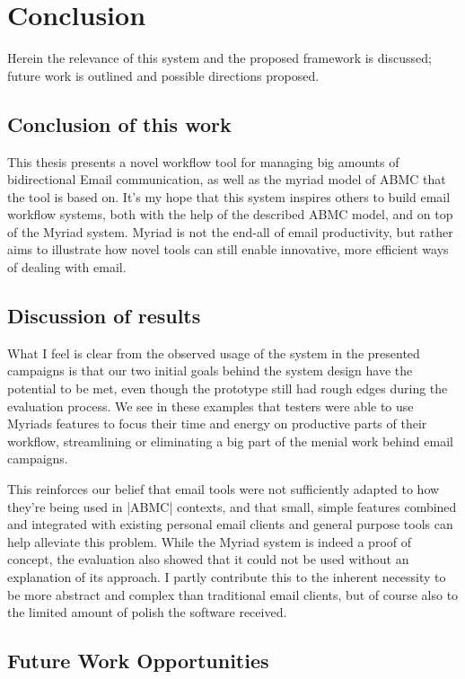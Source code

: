 \chapter{Conclusion}
\label{chapter:Conclusion}

Herein the relevance of this system and the proposed framework is discussed; future work is outlined and possible directions proposed.

\section{Conclusion of this work}

This thesis presents a novel workflow tool for managing big amounts of bidirectional Email communication, as well as the myriad model of ABMC that the tool is based on.
It’s my hope that this system inspires others to build email workflow systems, both with the help of the described ABMC model, and on top of the Myriad system. Myriad is not the end-all of email productivity, but rather aims to illustrate how novel tools can still enable innovative, more efficient ways of dealing with email.

\section{Discussion of results}

What I feel is clear from the observed usage of the system in the presented campaigns is that our two initial goals behind the system design have the potential to be met, even though the prototype still had rough edges during the evaluation process. We see in these examples that testers were able to use Myriads features to focus their time and energy on productive parts of their workflow, streamlining or eliminating a big part of the menial work behind email campaigns.

This reinforces our belief that email tools were not sufficiently adapted to how they’re being used in |ABMC| contexts, and that small, simple features combined and integrated with existing personal email clients and general purpose tools can help alleviate this problem.
While the Myriad system is indeed a proof of concept, the evaluation also showed that it could not be used without an explanation of its approach. I partly contribute this to the inherent necessity to be more abstract and complex than traditional email clients, but of course also to the limited amount of polish the software received.

\section{Future Work Opportunities}

